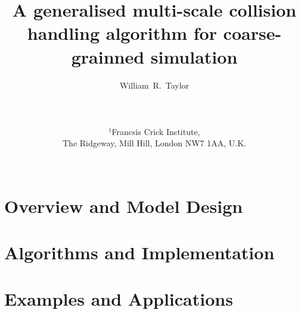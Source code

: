 \documentclass[12pt]{article}
\begin{document}
\title{\bf A generalised multi-scale collision handling algorithm for coarse-grainned simulation
}

\author{
William~R.~Taylor\\ \\ \\ \\
$^\dagger$Francsis Crick Institute,\\
The Ridgeway, Mill Hill, London NW7 1AA, U.K.\\ \\ 
}
\begin{singlespace}
\maketitle
\end{singlespace}
\clearpage
%
\part{Overview and Model Design}

\clearpage
\part{Algorithms and Implementation}

\clearpage

\clearpage
\part{Examples and Applications}

\clearpage
%
%
%
\end{document}
